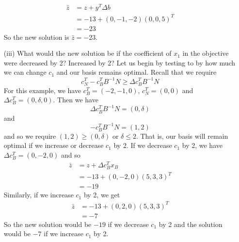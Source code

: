 \documentclass{article}
\begin{document}
\begin{itemize}
    \begin{align*}
        \bar{z} &= z + y^T\Delta b\\
        &= -13 + (0,-1,-2)(0,0,5)^T\\
        &= -23
    \end{align*}
    So the new solution is $\bar{z} = -23$.
    \newline\newline
    \item[(iii)] What would the new solution be if the coefficient of $x_1$ in the objective were decreased by 2? Increased by 2?
    \newline\newline
    Let us begin by testing to by how much we can change $c_1$ and our basis remains optimal. Recall that we require
    \[c_N^T - c_B^TB^{-1}N \geq \Delta c_B^TB^{-1}N\]
    For this example, we have $c_B^T = (-2,-1,0)$, $c_N^T = (0,0)$ and $\Delta c_B^T = (0, \delta, 0)$. Then we have 
    \[\Delta c_B^T B^{-1}N = (0,\delta)\]
    and
    \[-c_B^TB^{-1}N = (1,2)\]
    and so we require $(1,2) \geq (0,\delta)$ or $\delta \leq 2$. That is, our basis will remain optimal if we increase or decrease $c_1$ by 2. If we decrease $c_1$ by 2, we have $\Delta c_B^T = (0,-2,0)$ and so
    \begin{align*}
        \bar{z} &= z + \Delta c_B^Tx_B\\
        &= -13 + (0,-2,0)(5,3,3)^T\\
        &= -19
    \end{align*}
    Similarly, if we increase $c_1$ by 2, we get
    \begin{align*}
        \bar{z} &= -13 + (0,2,0)(5,3,3)^T\\
        &= -7
    \end{align*}
    So the new solution would be $-19$ if we decrease $c_1$ by 2 and the solution would be $-7$ if we increase $c_1$ by 2.
\end{itemize}
\end{document}

